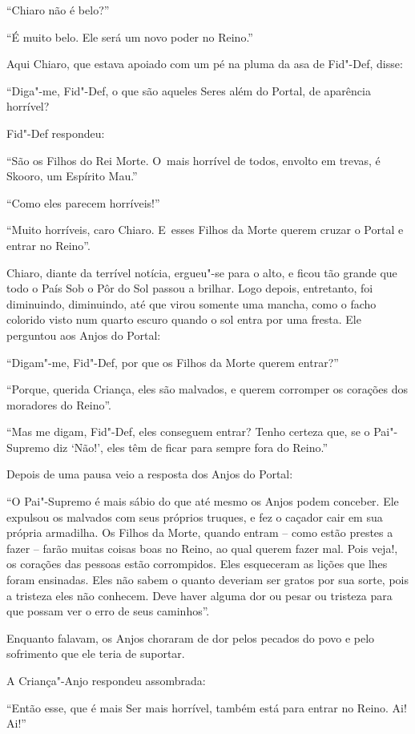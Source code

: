 ``Chiaro não é belo?''

``É muito belo. Ele será um novo poder no Reino.''

Aqui Chiaro, que estava apoiado com um pé na pluma da asa de Fid"-Def,
disse:

``Diga"-me, Fid"-Def, o que são aqueles Seres além do Portal, de aparência
horrível?

Fid"-Def respondeu:

``São os Filhos do Rei Morte. O~mais horrível de todos, envolto em
trevas, é Skooro, um Espírito Mau.''

``Como eles parecem horríveis!''

``Muito horríveis, caro Chiaro. E~esses Filhos da Morte querem cruzar o
Portal e entrar no Reino''.

Chiaro, diante da terrível notícia, ergueu"-se para o alto, e ficou tão
grande que todo o País Sob o Pôr do Sol passou a brilhar. Logo depois,
entretanto, foi diminuindo, diminuindo, até que virou somente uma
mancha, como o facho colorido visto num quarto escuro quando o sol entra
por uma fresta. Ele perguntou aos Anjos do Portal:

``Digam"-me, Fid"-Def, por que os Filhos da Morte querem entrar?''

``Porque, querida Criança, eles são malvados, e querem corromper os
corações dos moradores do Reino''.

``Mas me digam, Fid"-Def, eles conseguem entrar? Tenho certeza que, se o
Pai"-Supremo diz `Não!', eles têm de ficar para sempre fora do Reino.''

Depois de uma pausa veio a resposta dos Anjos do Portal:

``O Pai"-Supremo é mais sábio do que até mesmo os Anjos podem conceber.
Ele expulsou os malvados com seus próprios truques, e fez o caçador cair
em sua própria armadilha. Os Filhos da Morte, quando entram -- como
estão prestes a fazer -- farão muitas coisas boas no Reino, ao qual
querem fazer mal. Pois veja!, os corações das pessoas estão corrompidos.
Eles esqueceram as lições que lhes foram ensinadas. Eles não sabem o
quanto deveriam ser gratos por sua sorte, pois a tristeza eles não
conhecem. Deve haver alguma dor ou pesar ou tristeza para que possam ver
o erro de seus caminhos''.

Enquanto falavam, os Anjos choraram de dor pelos pecados do povo e pelo
sofrimento que ele teria de suportar.

A Criança"-Anjo respondeu assombrada:

``Então esse, que é mais Ser mais horrível, também está para entrar no
Reino. Ai! Ai!''

